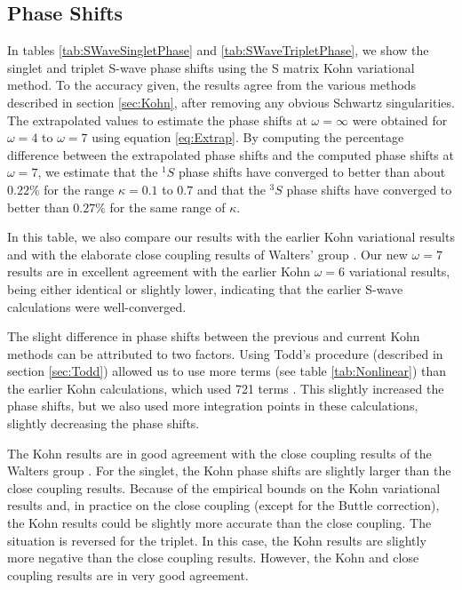 \documentclass[preprint,showpacs,preprintnumbers,amsmath,amssymb]{revtex4}
\begin{document}
\subsection{Phase Shifts}

In tables \ref{tab:SWaveSingletPhase} and \ref{tab:SWaveTripletPhase}, we show the singlet and triplet S-wave phase shifts using the S matrix Kohn variational method. To the accuracy given, the results agree from the various methods described in section \ref{sec:Kohn}, after removing any obvious Schwartz singularities. The extrapolated values to estimate the phase shifts at $\omega = \infty$ were obtained for $\omega = 4$ to $\omega = 7$ using equation \ref{eq:Extrap}. By computing the percentage difference between the extrapolated phase shifts and the computed phase shifts at $\omega=7$, we estimate that the $^1S$ phase shifts have converged to better than about $0.22\%$ for the range $\kappa=0.1$ to $0.7$ and that the $^3S$ phase shifts have converged to better than $0.27\%$ for the same range of $\kappa$.

In this table, we also compare our results with the earlier Kohn variational results \cite{VanReeth2003,VanReeth2004} and with the elaborate close coupling results of Walters' group \cite{Blackwood2002,Walters2004}. Our new $\omega = 7$ results are in excellent agreement with the earlier Kohn $\omega = 6$ variational results, being either identical or slightly lower, indicating that the earlier S-wave calculations were well-converged.


The slight difference in phase shifts between the previous and current Kohn methods can be attributed to two factors. Using Todd's procedure (described in section \ref{sec:Todd}) allowed us to use more terms (see table \ref{tab:Nonlinear}) than the earlier Kohn calculations, which used 721 terms  \cite{VanReeth2003}. This slightly increased the phase shifts, but we also used more integration points in these calculations, slightly decreasing the phase shifts.

The Kohn results are in good agreement with the close coupling results of the Walters group \cite{Blackwood2002,Walters2004}. For the singlet, the Kohn phase shifts are slightly larger than the close coupling results. Because of the empirical bounds on the Kohn variational results and, in practice on the close coupling (except for the Buttle correction), the Kohn results could be slightly more accurate than the close coupling.
The situation is reversed for the triplet. In this case, the Kohn results are slightly more negative than the close coupling results.
However, the Kohn and close coupling results are in very good agreement.
\end{document}
